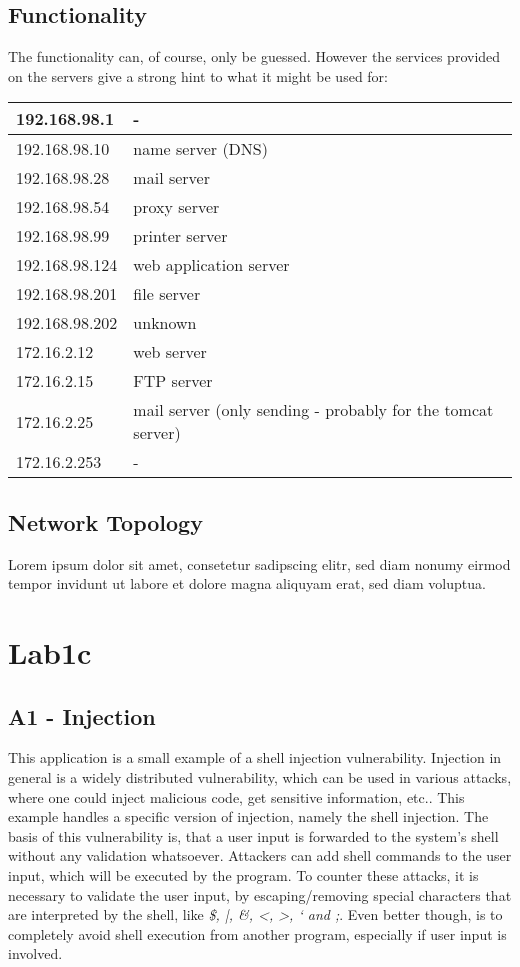 \documentclass[12pt,a4paper,titlepage,oneside]{scrartcl}
\begin{document}
\subsection{Functionality}
The functionality can, of course, only be guessed. However the services provided on the servers give a strong hint to what it might be used for:
 
\begin{tabular}{| l | l |}
\hline
192.168.98.1 & - \\ \hline
192.168.98.10 & name server (DNS) \\ \hline
192.168.98.28 & mail server \\ \hline
192.168.98.54 & proxy server \\ \hline
192.168.98.99 & printer server \\ \hline
192.168.98.124 & web application server \\ \hline
192.168.98.201 & file server \\ \hline
192.168.98.202 & unknown \\ \hline
172.16.2.12 & web server \\ \hline
172.16.2.15 & FTP server \\ \hline
172.16.2.25 & mail server (only sending - probably for the tomcat server) \\ \hline
172.16.2.253 & - \\ \hline
\end{tabular}

\subsection{Network Topology}
Lorem ipsum dolor sit amet, consetetur sadipscing elitr, sed diam nonumy eirmod tempor invidunt ut labore et dolore magna aliquyam erat, sed diam voluptua.

\section{Lab1c}

\subsection{A1 - Injection}
This application is a small example of a shell injection vulnerability. Injection in general is a widely distributed vulnerability, which can be used
in various attacks, where one could inject malicious code, get sensitive information, etc.. This example handles a specific version of injection, namely the shell injection. The basis of this vulnerability is, that a user input is forwarded to the system's shell without any validation whatsoever. Attackers can add shell commands to the user input, which will be executed by the program. To counter these attacks, it is necessary to validate the user input, by escaping/removing special characters that are interpreted by the shell, like  \textit{\$, |, \&, <, >, ` and ;}. Even better though, is to completely avoid shell execution from another program, especially if user input is involved.
\end{document}
